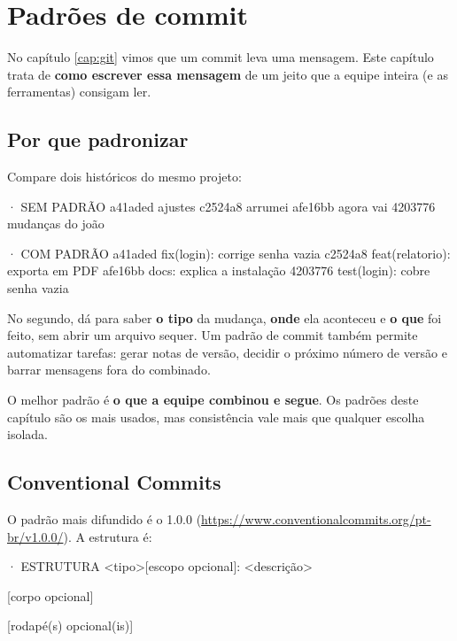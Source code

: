 \chapter{Padrões de commit}
\label{cap:padroes}

No capítulo \ref{cap:git} vimos que um commit leva uma mensagem. Este capítulo trata de \textbf{como escrever essa mensagem} de um jeito que a equipe inteira (e as ferramentas) consigam ler.

\section{Por que padronizar}

Compare dois históricos do mesmo projeto:

\begin{saidat}{· SEM PADRÃO}
a41aded ajustes
c2524a8 arrumei
afe16bb agora vai
4203776 mudanças do joão
\end{saidat}
\begin{saidat}{· COM PADRÃO}
a41aded fix(login): corrige senha vazia
c2524a8 feat(relatorio): exporta em PDF
afe16bb docs: explica a instalação
4203776 test(login): cobre senha vazia
\end{saidat}

No segundo, dá para saber \textbf{o tipo} da mudança, \textbf{onde} ela aconteceu e \textbf{o que} foi feito, sem abrir um arquivo sequer. Um padrão de commit também permite automatizar tarefas: gerar notas de versão, decidir o próximo número de versão e barrar mensagens fora do combinado.

\begin{conceito}
O melhor padrão é \textbf{o que a equipe combinou e segue}. Os padrões deste capítulo são os mais usados, mas consistência vale mais que qualquer escolha isolada.
\end{conceito}

\section{Conventional Commits}

O padrão mais difundido é o  1.0.0 (\url{https://www.conventionalcommits.org/pt-br/v1.0.0/}). A estrutura é:

\begin{terminalt}{· ESTRUTURA}
<tipo>[escopo opcional]: <descrição>

[corpo opcional]

[rodapé(s) opcional(is)]
\end{terminalt}

